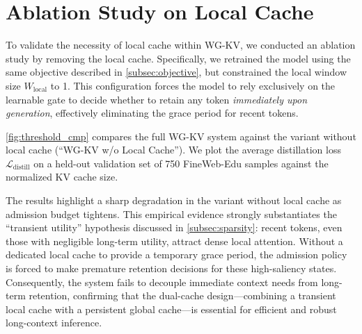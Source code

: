 \section{Ablation Study on Local Cache}
\label{app:local}


To validate the necessity of local cache within WG-KV, we conducted an ablation study by removing the local cache. Specifically, we retrained the model using the same objective described in \cref{subsec:objective}, but constrained the local window size $W_{\text{local}}$ to 1. This configuration forces the model to rely exclusively on the learnable gate to decide whether to retain any token \textit{immediately upon generation}, effectively eliminating the grace period for recent tokens.

\cref{fig:threshold_cmp} compares the full WG-KV system against the variant without local cache (``WG-KV w/o Local Cache''). We plot the average distillation loss $\mathcal{L}_{\text{distill}}$ on a held-out validation set of 750 FineWeb-Edu samples against the normalized KV cache size.

The results highlight a sharp degradation in the variant without local cache as admission budget tightens. This empirical evidence strongly substantiates the ``transient utility'' hypothesis discussed in \cref{subsec:sparsity}: recent tokens, even those with negligible long-term utility, attract dense local attention. Without a dedicated local cache to provide a temporary grace period, the admission policy is forced to make premature retention decisions for these high-saliency states. Consequently, the system fails to decouple immediate context needs from long-term retention, confirming that the dual-cache design---combining a transient local cache with a persistent global cache---is essential for efficient and robust long-context inference.
